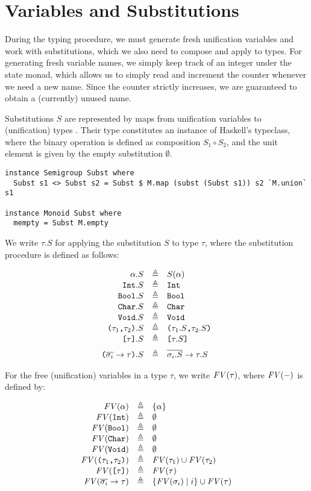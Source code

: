 \section{Variables and Substitutions}

During the typing procedure, we must generate fresh unification variables and
work with substitutions, which we also need to compose and apply to types.
For generating fresh variable names, we simply keep track of an integer
 under the state monad, which allows us to simply read and
increment the counter whenever we need a new name. Since the counter strictly
increases, we are guaranteed to obtain a (currently) unused name.

Substitutions $S$ are represented by maps from unification variables
 to (unification) types . Their type 
constitutes an instance of Haskell's  typeclass, where the
binary operation is defined as composition $S_1 \circ S_2$, and the unit element
is given by the empty substitution $\emptyset$.

\begin{verbatim}
instance Semigroup Subst where
  Subst s1 <> Subst s2 = Subst $ M.map (subst (Subst s1)) s2 `M.union` s1

instance Monoid Subst where
  mempty = Subst M.empty
\end{verbatim}

We write $\tau.S$ for applying the substitution $S$ to type $\tau$, where the
substitution procedure is defined as follows:

\[
\begin{array}{rcl}
  \alpha.S & \eqdef & S(\alpha) \\
  \Int.S & \eqdef & \Int \\
  \Bool.S & \eqdef & \Bool \\
  \Char.S & \eqdef & \Char \\
  \Void.S & \eqdef & \Void \\
  \TProd{\tau_1}{\tau_2}.S & \eqdef & \TProd{\tau_1.S}{\tau_2.S} \\
  \TList{\tau}.S & \eqdef & \TList{\tau.S} \br
  \Parens{ \TFun{\set{\sigma_i}}{\tau} }.S & \eqdef & \TFun{\set{\sigma_i.S}}{\tau.S}
\end{array}
\]

For the free (unification) variables in a type $\tau$, we write $\mathit{FV}(\tau)$, where
$\mathit{FV}(-)$ is defined by:

\[
\begin{array}{rcl}
  \mathit{FV}(\alpha) & \triangleq & \{ \alpha \} \\
  \mathit{FV}(\texttt{Int}) & \triangleq & \emptyset \\
  \mathit{FV}(\texttt{Bool}) & \triangleq & \emptyset \\
  \mathit{FV}(\texttt{Char}) & \triangleq & \emptyset \\
  \mathit{FV}(\texttt{Void}) & \triangleq & \emptyset \\
  \mathit{FV}( \texttt{(}\tau_1\texttt{,}\tau_2\texttt{)} ) & \triangleq & \mathit{FV}(\tau_1) \cup \mathit{FV}(\tau_2) \\
  \mathit{FV}( \texttt{[}\tau\texttt{]} ) & \triangleq & \mathit{FV}(\tau) \\
  \mathit{FV}( \overline{\sigma_i} \to \tau ) & \triangleq & \{ \mathit{FV}(\sigma_i) \mid i \} \cup \mathit{FV}(\tau)
\end{array}
\]

